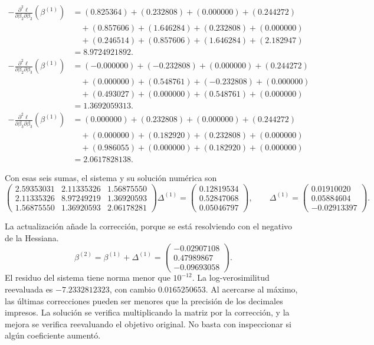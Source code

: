 \documentclass[11pt,a4paper]{article}
\begin{document}
\[
\begin{aligned}
-\frac{\partial^2\ell}{\partial\beta_2\partial\beta_2}(\beta^{(1)})&=(0.825364)+(0.232808)+(0.000000)+(0.244272)\\&\quad+(0.857606)+(1.646284)+(0.232808)+(0.000000)\\&\quad+(0.246514)+(0.857606)+(1.646284)+(2.182947)\\&=8.9724921892.\end{aligned}
\]
\[
\begin{aligned}
-\frac{\partial^2\ell}{\partial\beta_2\partial\beta_3}(\beta^{(1)})&=(-0.000000)+(-0.232808)+(0.000000)+(0.244272)\\&\quad+(0.000000)+(0.548761)+(-0.232808)+(0.000000)\\&\quad+(0.493027)+(0.000000)+(0.548761)+(0.000000)\\&=1.3692059313.\end{aligned}
\]
\[
\begin{aligned}
-\frac{\partial^2\ell}{\partial\beta_3\partial\beta_3}(\beta^{(1)})&=(0.000000)+(0.232808)+(0.000000)+(0.244272)\\&\quad+(0.000000)+(0.182920)+(0.232808)+(0.000000)\\&\quad+(0.986055)+(0.000000)+(0.182920)+(0.000000)\\&=2.0617828138.\end{aligned}
\]

Con esas seis sumas, el sistema y su solución numérica son
\[
\begin{pmatrix}2.59353031&2.11335326&1.56875550\\2.11335326&8.97249219&1.36920593\\1.56875550&1.36920593&2.06178281\end{pmatrix}\Delta^{(1)}=\begin{pmatrix}0.12819534\\0.52847068\\0.05046797\end{pmatrix},\qquad\Delta^{(1)}=\begin{pmatrix}0.01910020\\0.05884604\\-0.02913397\end{pmatrix}.
\]

La actualización añade la corrección, porque se está resolviendo
con el negativo de la Hessiana.
\[
\beta^{(2)}=\beta^{(1)}+\Delta^{(1)}=\begin{pmatrix}-0.02907108\\0.47989867\\-0.09693058\end{pmatrix}.
\]
El residuo del sistema tiene norma menor que \(10^{-12}\). La log-verosimilitud reevaluada es \(-7.2332812323\), con cambio \(0.0165250653\). 
Al acercarse al máximo, las últimas correcciones pueden ser
menores que la precisión de los decimales impresos.
La solución se verifica multiplicando la matriz por la corrección,
y la mejora se verifica reevaluando el objetivo original.
No basta con inspeccionar si algún coeficiente aumentó.
\endgroup
\end{document}
